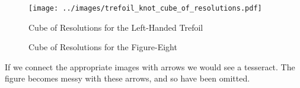 \documentclass{article}
\theoremstyle{plain}
\begin{document}
        \begin{figure}
            \centering
            \texttt{[image: ../images/trefoil\_knot\_cube\_of\_resolutions.pdf]}
            \caption{Cube of Resolutions for the Left-Handed Trefoil}
            \label{fig:trefoil_knot_cube_of_resolutions}
        \end{figure}
        \begin{figure}
            \centering
            \caption{Cube of Resolutions for the Figure-Eight}
            \label{fig:figure_eight_knot_cube_of_resolutions}
        \end{figure}
        If we connect the appropriate images with arrows we would see a
        tesseract. The figure becomes messy with these arrows, and so have
        been omitted.
\end{document}
